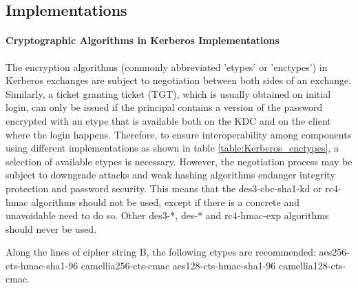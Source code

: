 \subsection{Implementations}
\label{subsection:kerberos_implementations}

\paragraph{Cryptographic Algorithms in Kerberos Implementations}

The encryption algorithms (commonly abbreviated 'etypes' or 'enctypes') in Kerberos exchanges are subject to negotiation between both sides of an exchange. Similarly, a ticket granting ticket (TGT), which is usually obtained on initial login, can only be issued if the principal contains a version of the password encrypted with an etype that is available both on the KDC and on the client where the login happens. Therefore, to ensure interoperability among components using different implementations as shown in table \ref{table:Kerberos_enctypes}, a selection of available etypes is necessary. However, the negotiation process may be subject to downgrade attacks and weak hashing algorithms endanger integrity protection and password security. This means that the des3-cbc-sha1-kd or rc4-hmac algorithms should not be used, except if there is a concrete and unavoidable need to do so. Other des3-*, des-* and rc4-hmac-exp algorithms should never be used.

Along the lines of cipher string B, the following etypes are recommended: aes256-cts-hmac-sha1-96 camellia256-cts-cmac aes128-cts-hmac-sha1-96 camellia128-cts-cmac.


